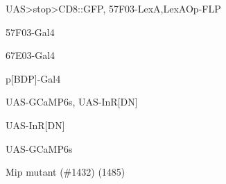 \documentclass[17pt]{extarticle}
\begin{document}
\newpage{}
\vspace*{\fill}\begin{scriptsize}
UAS>stop>CD8::GFP, 57F03-LexA,LexAOp-FLP \\[0.5em]
\end{scriptsize}
\footnotesize
\vspace*{\fill}
\newpage{}
\vspace*{\fill}\begin{large}
57F03-Gal4 \\[0.5em]
\end{large}
\footnotesize
\vspace*{\fill}
\newpage{}
\vspace*{\fill}\begin{large}
67E03-Gal4 \\[0.5em]
\end{large}
\footnotesize
\vspace*{\fill}
\newpage{}
\vspace*{\fill}\begin{normalsize}
p[BDP]-Gal4 \\[0.5em]
\end{normalsize}
\footnotesize
\vspace*{\fill}
\newpage{}
\vspace*{\fill}\begin{footnotesize}
UAS-GCaMP6s, UAS-InR[DN] \\[0.5em]
\end{footnotesize}
\footnotesize
\vspace*{\fill}
\newpage{}
\vspace*{\fill}\begin{normalsize}
UAS-InR[DN] \\[0.5em]
\end{normalsize}
\footnotesize
\vspace*{\fill}
\newpage{}
\vspace*{\fill}\begin{normalsize}
UAS-GCaMP6s \\[0.5em]
\end{normalsize}
\footnotesize
\vspace*{\fill}
\newpage{}
\vspace*{\fill}\begin{footnotesize}
Mip mutant (\#1432) (1485) \\[0.5em]
\end{footnotesize}
\footnotesize
\vspace*{\fill}
\end{document}
